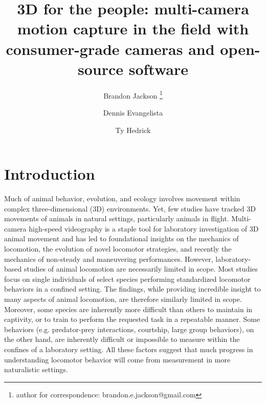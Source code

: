 \documentclass[fleqn,10pt]{wlpeerj}
\title{3D for the people: multi-camera motion capture in the field with consumer-grade cameras and open-source software}
\author[1,2]{Brandon Jackson \thanks{author for correspondence: brandon.e.jackson@gmail.com}}
\author[2]{Dennis Evangelista}
\author[2]{Ty Hedrick}
\affil[1]{Longwood College, Charlottesville, VA}
\affil[2]{University of North Carolina at Chapel Hill, NC 27599-3280, USA}
\begin{document}
\newcommand{\ty}[1]{{\color{blue} #1}}
\newcommand{\dennis}[1]{{\color{red} #1}} %
\newcommand{\brandon}[1]{{\color{cyan} #1}}

\flushbottom
\maketitle
\thispagestyle{empty}

\modulolinenumbers[5]
\linenumbers

\section*{Introduction}


Much of animal behavior, evolution, and ecology involves movement within complex three-dimensional (3D) environments.  Yet, few studies have tracked 3D movements of animals in natural settings, particularly animals in flight.  Multi-camera high-speed videography is a staple tool for laboratory investigation of 3D animal movement and has led to foundational insights on the mechanics of locomotion, the evolution of novel locomotor strategies, and recently the mechanics of non-steady and maneuvering performances. However, laboratory-based studies of animal locomotion are necessarily limited in scope.  Most studies focus on single individuals of select species performing standardized locomotor behaviors in a confined setting.  The findings, while providing incredible insight to many aspects of animal locomotion, are therefore similarly limited in scope.  Moreover, some species are inherently more difficult than others to maintain in captivity, or to train to perform the requested task in a repeatable manner.  Some behaviors (e.g. predator-prey interactions, courtship, large group behaviors), on the other hand, are inherently difficult or impossible to measure within the confines of a laboratory setting. All these factors suggest that much progress in understanding locomotor behavior will come from measurement in more naturalistic settings. 
\end{document}

